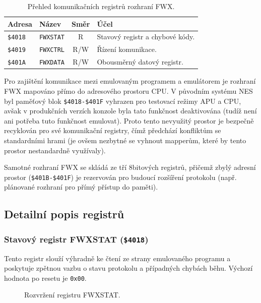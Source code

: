 \begin{table}[htbp]
    \centering
    \begin{tabular}{llcp{7cm}}
        \toprule
        \textbf{Adresa} & \textbf{Název} & \textbf{Směr} & \textbf{Účel} \\
        \midrule
        \texttt{\$4018} & \texttt{FWXSTAT} & R & Stavový registr a chybové kódy. \\
        \texttt{\$4019} & \texttt{FWXCTRL} & R/W & Řízení komunikace. \\
        \texttt{\$401A} & \texttt{FWXDATA} & R/W & Obousměrný datový registr. \\
        \bottomrule
    \end{tabular}
    \caption{Přehled komunikačních registrů rozhraní FWX.}
    \label{tab:fwx_regs}
\end{table}

Pro zajištění komunikace mezi emulovaným programem a emulátorem je rozhraní FWX mapováno přímo do
adresového prostoru CPU. V původním systému NES byl paměťový blok \texttt{\$4018-\$401F} vyhrazen
pro testovací režimy APU a CPU, avšak v produkčních verzích konzole byla tato funkčnost deaktivována
(tudíž není ani potřeba tuto funkčnost emulovat). Proto tento nevyužitý prostor je bezpečně
recyklován pro své komunikační registry, čímž předchází konfliktům se standardními hrami (je ovšem
nezbytné se vyhnout mapperům, které by tento prostor nestandardně využívaly).

Samotné rozhraní FWX se skládá ze tří 8bitových registrů, přičemž zbylý adresní prostor
(\texttt{\$401B-\$401F}) je rezervován pro budoucí rozšíření protokolu (např. plánované rozhraní pro
přímý přístup do paměti).

\subsection{Detailní popis registrů}

\label{sec:fwxstat}
\subsubsection{Stavový registr FWXSTAT (\texttt{\$4018})}

Tento registr slouží výhradně ke čtení ze strany emulovaného programu a poskytuje zpětnou vazbu o
stavu protokolu a případných chybách běhu. Výchozí hodnota po resetu je \texttt{0x00}.

\begin{figure}[H]
    \centering
    
    \caption{Rozvržení registru FWXSTAT.}
\end{figure}

